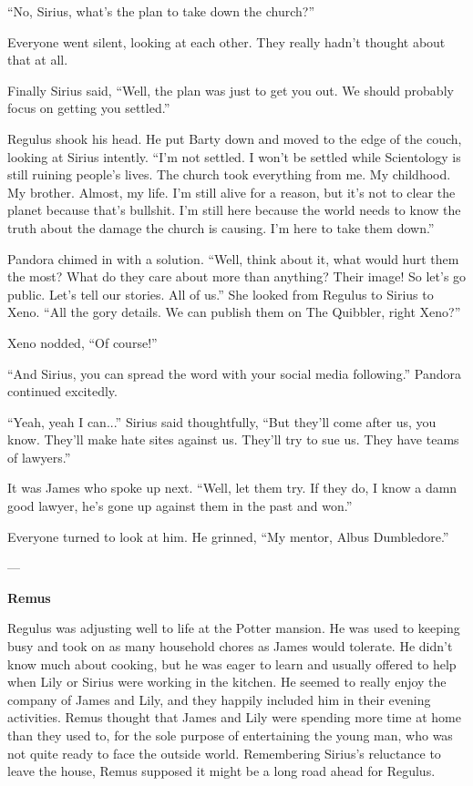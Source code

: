 \documentclass[12pt,twoside,openright]{memoir}
\begin{document}
``No, Sirius, what's the plan to take down the church?''

Everyone went silent, looking at each other. They really hadn't thought about that at all.

Finally Sirius said, ``Well, the plan was just to get you out. We should probably focus on getting you settled.'' 

Regulus shook his head. He put Barty down and moved to the edge of the couch, looking at Sirius intently. ``I'm not settled. I won't be settled while Scientology is still ruining people's lives. The church took everything from me. My childhood. My brother. Almost, my life. I'm still alive for a reason, but it's not to clear the planet because that's bullshit. I'm still here because the world needs to know the truth about the damage the church is causing. I'm here to take them down.''

Pandora chimed in with a solution. ``Well, think about it, what would hurt them the most? What do they care about more than anything? Their image! So let's go public. Let's tell our stories. All of us.'' She looked from Regulus to Sirius to Xeno. ``All the gory details. We can publish them on The Quibbler, right Xeno?''

Xeno nodded, ``Of course!''

``And Sirius, you can spread the word with your social media following.'' Pandora continued excitedly.

``Yeah, yeah I can...'' Sirius said thoughtfully, ``But they'll come after us, you know. They'll make hate sites against us. They'll try to sue us. They have teams of lawyers.''

It was James who spoke up next. ``Well, let them try. If they do, I know a damn good lawyer, he's gone up against them in the past and won.''

Everyone turned to look at him. He grinned, ``My mentor, Albus Dumbledore.''

---

\textbf{Remus} 

Regulus was adjusting well to life at the Potter mansion. He was used to keeping busy and took on as many household chores as James would tolerate. He didn't know much about cooking, but he was eager to learn and usually offered to help when Lily or Sirius were working in the kitchen. He seemed to really enjoy the company of James and Lily, and they happily included him in their evening activities. Remus thought that James and Lily were spending more time at home than they used to, for the sole purpose of entertaining the young man, who was not quite ready to face the outside world. Remembering Sirius's reluctance to leave the house, Remus supposed it might be a long road ahead for Regulus. 
\end{document}
